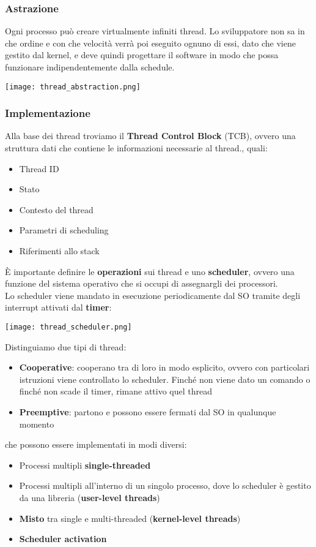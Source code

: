 \subsubsection{Astrazione}
Ogni processo può creare virtualmente infiniti thread. Lo sviluppatore non sa in che ordine e con che velocità verrà poi eseguito ognuno di essi, dato che viene gestito dal kernel, e deve quindi progettare il software in modo che possa funzionare indipendentemente dalla schedule.
\begin{center}
	\texttt{[image: thread\_abstraction.png]}
\end{center}

\subsubsection{Implementazione}
Alla base dei thread troviamo il \textbf{Thread Control Block} (TCB), ovvero una struttura dati che contiene le informazioni necessarie al thread., quali:
\begin{itemize}
	\item Thread ID
	\item Stato
	\item Contesto del thread
	\item Parametri di scheduling
	\item Riferimenti allo stack
\end{itemize}
È importante definire le \textbf{operazioni} sui thread e uno \textbf{scheduler}, ovvero una funzione del sistema operativo che si occupi di assegnargli dei processori.\\
Lo scheduler viene mandato in esecuzione periodicamente dal SO tramite degli interrupt attivati dal \textbf{timer}:
\begin{center}
	\texttt{[image: thread\_scheduler.png]}
\end{center}
Distinguiamo due tipi di thread:
\begin{itemize}
	\item \textbf{Cooperative}: \label{thread_types}cooperano tra di loro in modo esplicito, ovvero con particolari istruzioni viene controllato lo scheduler. Finché non viene dato un comando o finché non scade il timer, rimane attivo quel thread
	\item \textbf{Preemptive}: partono e possono essere fermati dal SO in qualunque momento
\end{itemize}
che possono essere implementati in modi diversi:
\begin{itemize}
	\item Processi multipli \textbf{single-threaded}
	\item Processi multipli all'interno di un singolo processo, dove lo scheduler è gestito da una libreria (\textbf{user-level threads})
	\item \textbf{Misto} tra single e multi-threaded (\textbf{kernel-level threads})
	\item \textbf{Scheduler activation}
\end{itemize}

